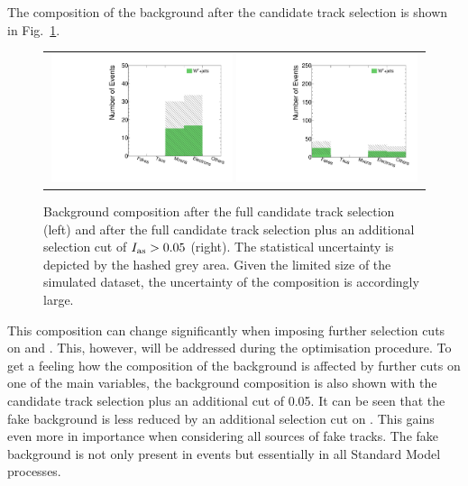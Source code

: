 The composition of the background after the candidate track selection is shown in Fig.~\ref{fig:BkgComposition}.
\begin{figure}[!bt]
  \centering 
  \begin{tabular}{c}
    \includegraphics[width=0.49\textwidth]{figures/analysis/AnalysisSelection/chiTracksfullSelectionTrigger_Wjets/htrackgenParticleSmallRange_lin.pdf}
    \includegraphics[width=0.49\textwidth]{figures/analysis/AnalysisSelection/chiTracksfullSelectionPlusIasTrigger_Wjets/htrackgenParticleSmallRange_lin.pdf}
  \end{tabular}
  \caption{Background composition after the full candidate track selection (left) and after the full candidate track selection plus an additional selection cut of \mbox{$I_{\text{as}}>0.05$} (right). 
           The statistical uncertainty is depicted by the hashed grey area.
           Given the limited size of the simulated \WJets dataset, the uncertainty of the composition is accordingly large.}
  \label{fig:BkgComposition}
\end{figure}
This composition can change significantly when imposing further selection cuts on \pt and \ias.
This, however, will be addressed during the optimisation procedure.
To get a feeling how the composition of the background is affected by further cuts on one of the main variables, 
the background composition is also shown with the candidate track selection plus an additional \ias cut of 0.05.
It can be seen that the fake background is less reduced by an additional selection cut on \ias.
This gains even more in importance when considering all sources of fake tracks.
The fake background is not only present in \WJets events but essentially in all Standard Model processes.\\

